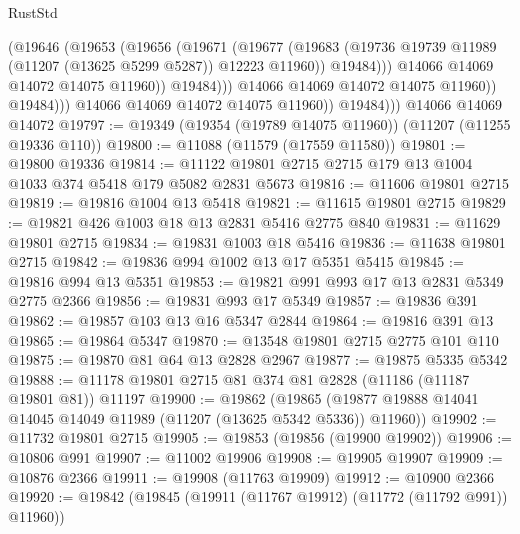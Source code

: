 \begin{lexlean}{RustStd}
\begin{coremodule}
                              (@19646
                                (@19653
                                  (@19656
                                    (@19671
                                      (@19677
                                        (@19683
                                          (@19736
                                            @19739
                                            @11989
                                            (@11207 (@13625 @5299 @5287))
                                            @12223
                                            @11960))
                                        @19484)))
                                  @14066
                                  @14069
                                  @14072
                                  @14075
                                  @11960))
                              @19484)))
                        @14066
                        @14069
                        @14072
                        @14075
                        @11960))
                    @19484)))
              @14066
              @14069
              @14072
              @14075
              @11960))
          @19484)))
    @14066
    @14069
    @14072
@19797 := @19349 (@19354 (@19789 @14075 @11960)) (@11207 (@11255 @19336 @110))
@19800 := @11088 (@11579 (@17559 @11580))
@19801 := @19800 @19336
@19814 := @11122 @19801 @2715 @2715 @179 @13 @1004 @1033 @374 @5418 @179 @5082 @2831 @5673
@19816 := @11606 @19801 @2715
@19819 := @19816 @1004 @13 @5418
@19821 := @11615 @19801 @2715
@19829 := @19821 @426 @1003 @18 @13 @2831 @5416 @2775 @840
@19831 := @11629 @19801 @2715
@19834 := @19831 @1003 @18 @5416
@19836 := @11638 @19801 @2715
@19842 := @19836 @994 @1002 @13 @17 @5351 @5415
@19845 := @19816 @994 @13 @5351
@19853 := @19821 @991 @993 @17 @13 @2831 @5349 @2775 @2366
@19856 := @19831 @993 @17 @5349
@19857 := @19836 @391
@19862 := @19857 @103 @13 @16 @5347 @2844
@19864 := @19816 @391 @13
@19865 := @19864 @5347
@19870 := @13548 @19801 @2715 @2775 @101 @110
@19875 := @19870 @81 @64 @13 @2828 @2967
@19877 := @19875 @5335 @5342
@19888 := @11178 @19801 @2715 @81 @374 @81 @2828 (@11186 (@11187 @19801 @81)) @11197
@19900 := @19862
    (@19865 (@19877 @19888 @14041 @14045 @14049 @11989 (@11207 (@13625 @5342 @5336)) @11960))
@19902 := @11732 @19801 @2715
@19905 := @19853 (@19856 (@19900 @19902))
@19906 := @10806 @991
@19907 := @11002 @19906
@19908 := @19905 @19907
@19909 := @10876 @2366
@19911 := @19908 (@11763 @19909)
@19912 := @10900 @2366
@19920 := @19842 (@19845 (@19911 (@11767 @19912) (@11772 (@11792 @991)) @11960))

\end{coremodule}
\end{lexlean}
